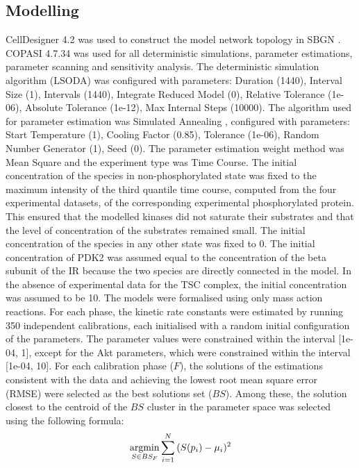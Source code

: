 \subsection{Modelling}
\label{paper1-subsec:Modelling}
CellDesigner 4.2 \citep{Funahashi2003, Funahashi2008} was used to construct the model network topology in SBGN \citep{lenovere2009systems}. COPASI 4.7.34 \citep{Hoops2006} was used for all deterministic simulations, parameter estimations, parameter scanning and sensitivity analysis. The deterministic simulation algorithm (LSODA) was configured with parameters: Duration (1440), Interval Size (1), Intervals (1440), Integrate Reduced Model (0), Relative Tolerance (1e-06), Absolute Tolerance (1e-12), Max Internal Steps (10000). The algorithm used for parameter estimation was Simulated Annealing \citep{Kirkpatrick83, Corana1987}, configured with parameters: Start Temperature (1), Cooling Factor (0.85), Tolerance (1e-06), Random Number Generator (1), Seed (0). The parameter estimation weight method was Mean Square and the experiment type was Time Course. The initial concentration of the species in non-phosphorylated state was fixed to the maximum intensity of the third quantile time course, computed from the four 
experimental datasets, of the corresponding experimental phosphorylated protein. This ensured that the modelled kinases did not saturate their substrates and that the level of concentration of the substrates remained small. The initial concentration of the species in any other state was fixed to 0. The initial concentration of PDK2 was assumed equal to the concentration of the beta subunit of the IR because the two species are directly connected in the model. In the absence of experimental data for the TSC complex, the initial concentration was assumed to be 10. The models were formalised using only mass action reactions. For each phase, the kinetic rate constants were estimated by running 350 independent calibrations, each initialised with a random initial configuration of the parameters. The parameter values were constrained within the interval [1e-04, 1], except for the Akt parameters, which were constrained within the interval [1e-04, 10]. For each calibration phase ($F$), the solutions of the 
estimations consistent with the data and achieving the lowest root mean square error (RMSE) were selected as the best solutions set ($BS$). Among these, the solution closest to the centroid of the $BS$ cluster in the parameter space was selected using the following formula:
\begin{align}
  \label{eq:centroid_formula}
  \argmin_{S \in BS_F} {\sum_{i=1}^{N}{(S(p_i) - \mu_i)^2}}
\end{align}

